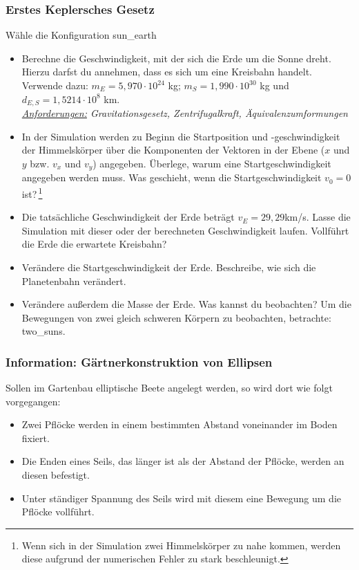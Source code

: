 \documentclass{scrartcl}
\begin{document}
        \subsubsection*{Erstes Keplersches Gesetz}
        \noindent Wähle die Konfiguration \glqq sun\_earth\grqq{}
        \begin{itemize}
            \item Berechne die Geschwindigkeit, mit der sich die Erde um die Sonne dreht. Hierzu darfst du annehmen, dass es sich um eine Kreisbahn handelt. Verwende dazu: $m_E=5,970\cdot 10^{24}$ kg; $m_S = 1,990 \cdot 10^{30}$ kg und $d_{E,S} = 1,5214 \cdot 10^8$ km. \\
            \textit{\uline{Anforderungen:} Gravitationsgesetz, Zentrifugalkraft, Äquivalenzumformungen}
            \item In der Simulation werden zu Beginn die Startposition und -geschwindigkeit der Himmelskörper über die Komponenten der Vektoren in der Ebene ($x$ und $y$ bzw. $v_x$ und $v_y$) angegeben. 
            Überlege, warum eine Startgeschwindigkeit angegeben werden muss. Was geschieht, wenn die Startgeschwindigkeit $v_0=0$ ist?\,\footnote{Wenn sich in der Simulation zwei Himmelskörper zu nahe kommen, werden diese aufgrund der numerischen Fehler zu stark beschleunigt.}
            \item Die tatsächliche Geschwindigkeit der Erde beträgt $v_E = 29,29$km/s. Lasse die Simulation mit dieser oder der berechneten Geschwindigkeit laufen. Vollführt die Erde die erwartete Kreisbahn?
            \item Verändere die Startgeschwindigkeit der Erde. Beschreibe, wie sich die Planetenbahn verändert. 
            \item Verändere außerdem die Masse der Erde. Was kannst du beobachten? Um die Bewegungen von zwei gleich schweren Körpern zu beobachten, betrachte: \glqq two\_suns\grqq{}. 
        \end{itemize}

        \subsubsection*{Information: Gärtnerkonstruktion von Ellipsen}
        Sollen im Gartenbau elliptische Beete angelegt werden, so wird dort wie folgt vorgegangen:
        \begin{itemize}
            \item Zwei Pflöcke werden in einem bestimmten Abstand voneinander im Boden fixiert.
            \item Die Enden eines Seils, das länger ist als der Abstand der Pflöcke, werden an diesen befestigt.
            \item Unter ständiger Spannung des Seils wird mit diesem eine Bewegung um die Pflöcke vollführt.
        \end{itemize}
\end{document}
